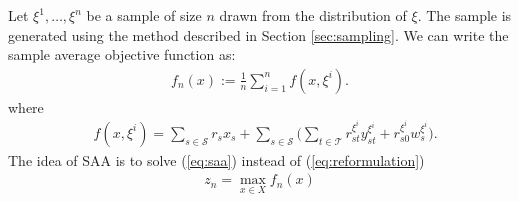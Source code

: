 \documentclass[forests,article,submit,moreauthors,pdftex]{Definitions/mdpi}
\begin{document}
Let $\xi^1, \dots, \xi^n$ be a sample of size $n$ drawn from the distribution of $\xi$. The sample is generated using the method described in Section \ref{sec:sampling}. We can write the sample average objective function as: 
\begin{align}
    f_n(x) := \frac{1}{n}\sum_{i=1}^{n} f(x, \xi^{i}). \label{eq:saa_funct}
\end{align}
where 
\begin{align}
    & f(x, \xi^{i}) = \sum_{s \in \mathcal{S}}r_{s} x_{s} + \sum_{s\in \mathcal{S}} \Big( \sum_{t\in \mathcal{T}} r^{\xi^{i}}_{st}y_{st}^{\xi^{i}}  + r^{\xi^{i}}_{s0} w_s^{\xi^{i}} \Big).
\end{align}
The idea of SAA is to solve (\ref{eq:saa}) instead of (\ref{eq:reformulation})
\begin{align}
     z_n = \max_{x \in X} f_n(x) \label{eq:saa}
\end{align}
\end{document}

